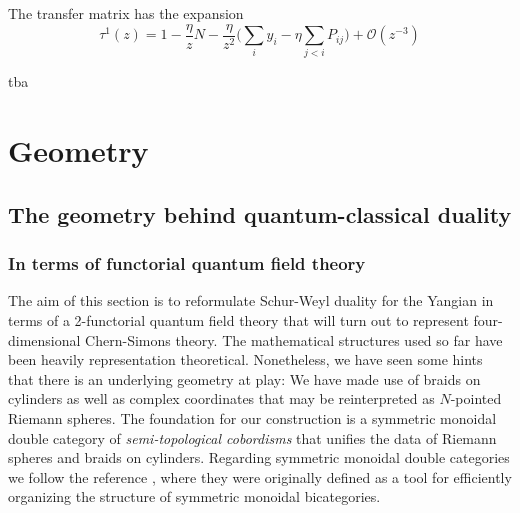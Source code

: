 \documentclass[11pt]{report}
\theoremstyle{definition}
\theoremstyle{remark}
\theoremstyle{remark}
\begin{document}
The transfer matrix has the expansion
\begin{equation*}
\tau^1(z) = 1 - \frac{\eta}{z} N - \frac{\eta}{z^2} \bigg( \sum_i y_i - \eta \sum_{j<i} P_{ij} \bigg) + \mathcal{O}(z^{-3})
\end{equation*}

tba

\chapter{Geometry}\label{chapter:geometry}

\section{The geometry behind quantum-classical duality}

\subsection{In terms of functorial quantum field theory}

The aim of this section is to reformulate Schur-Weyl duality for the Yangian in terms of a 2-functorial quantum field theory that will turn out to represent four-dimensional Chern-Simons theory. The mathematical structures used so far have been heavily representation theoretical. Nonetheless, we have seen some hints that there is an underlying geometry at play: We have made use of braids on cylinders as well as complex coordinates that may be reinterpreted as $N$-pointed Riemann spheres. The foundation for our construction is a symmetric monoidal double category of \emph{semi-topological cobordisms} that unifies the data of Riemann spheres and braids on cylinders. Regarding symmetric monoidal double categories we follow the reference \cite{article:hansen:2019}, where they were originally defined as a tool for efficiently organizing the structure of symmetric monoidal bicategories.
\end{document}
